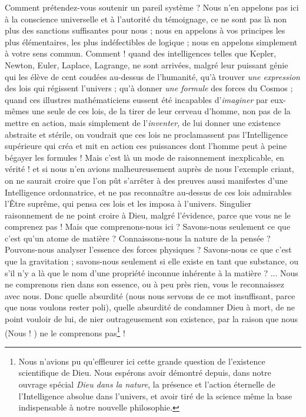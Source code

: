 \documentclass[a4paper, 11pt, oneside, landscape]{article}
\begin{document}
Comment prétendez-vous soutenir un pareil système ? Nous n'en appelons pas ici à la conscience universelle et à l'autorité du témoignage, ce ne sont pas là non plus des sanctions suffisantes pour nous ; nous en appelons à vos principes les plus élémentaires, les plus indéfectibles de logique ; nous en appelons simplement à votre sens commun. Comment ! quand des intelligences telles que Kepler, Newton, Euler, Laplace, Lagrange, ne sont arrivées, malgré leur puissant génie qui les élève de cent coudées au-dessus de l'humanité, qu'à trouver \emph{une expression} des lois qui régissent l'univers ; qu'à donner \emph{une formule} des forces du Cosmos ; quand ces illustres mathématiciens eussent été incapables d'\emph{imaginer} par eux-mêmes une seule de ces lois, de la tirer de leur cerveau d'homme, non pas de la mettre en action, mais simplement de l'\emph{inventer}, de lui donner une existence abstraite et stérile, on voudrait que ces lois ne proclamassent pas l'Intelligence supérieure qui créa et mit en action ces puissances dont l'homme peut à peine bégayer les formules ! Mais c'est là un mode de raisonnement inexplicable, en vérité ! et si nous n'en avions malheureusement auprès de nous l'exemple criant, on ne saurait croire que l'on pût s'arrêter à des preuves aussi manifestes d'une Intelligence ordonnatrice, et ne pas reconnaître au-dessus de ces lois admirables l'Être suprême, qui pensa ces lois et les imposa à l'univers. Singulier raisonnement de ne point croire à Dieu, malgré l'évidence, parce que vous ne le comprenez pas ! Mais que comprenons-nous ici ? Savons-nous seulement ce que c'est qu'un atome de matière ? Connaissons-nous la nature de la pensée ? Pouvons-nous analyser l'essence des forces physiques ? Savons-nous ce que c'est que la gravitation ; savons-nous seulement si elle existe en tant que substance, ou s'il n'y a là que le nom d'une propriété inconnue inhérente à la matière ? ... Nous ne comprenons rien dans son essence, ou à peu près rien, vous le reconnaissez avec nous. Donc quelle absurdité (nous nous servons de ce mot insuffisant, parce que nous voulons rester poli), quelle absurdité de condamner Dieu à mort, de ne point vouloir de lui, de nier outrageusement son existence, par la raison que nous (Nous ! ) ne le comprenons pas\footnote{Nous n'avions pu qu'effleurer ici cette grande question de l'existence scientifique de Dieu. Nous espérons avoir démontré depuis, dans notre ouvrage spécial \emph{Dieu dans la nature}, la présence et l'action éternelle de l'Intelligence absolue dans l'univers, et avoir tiré de la science même la base indispensable à notre nouvelle philosophie.} !
\end{document}
